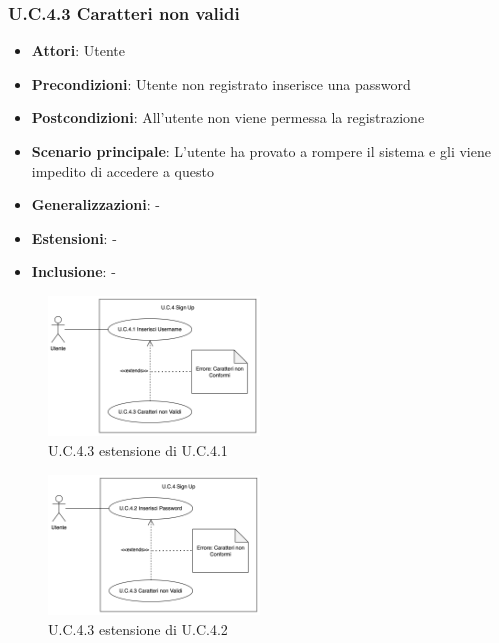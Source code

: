 \subsubsection{U.C.4.3 Caratteri non validi}
\begin{itemize}
    \item \textbf{Attori}: Utente
    \item \textbf{Precondizioni}: Utente non registrato inserisce una password
    \item \textbf{Postcondizioni}: All'utente non viene permessa la registrazione
    \item \textbf{Scenario principale}: L'utente ha provato a rompere il sistema e gli viene impedito di accedere a questo
    \item \textbf{Generalizzazioni}: -
    \item \textbf{Estensioni}: -
    \item \textbf{Inclusione}: -
\end{itemize}
\begin{figure}[H]
    \centering
    \includegraphics[width=0.5\textwidth]{img/UC4-3.png}
    \caption{U.C.4.3 estensione di U.C.4.1}
\end{figure}
\begin{figure}[H]
    \centering
    \includegraphics[width=0.5\textwidth]{img/UC4-3-2.png}
    \caption{U.C.4.3 estensione di U.C.4.2}
\end{figure}
